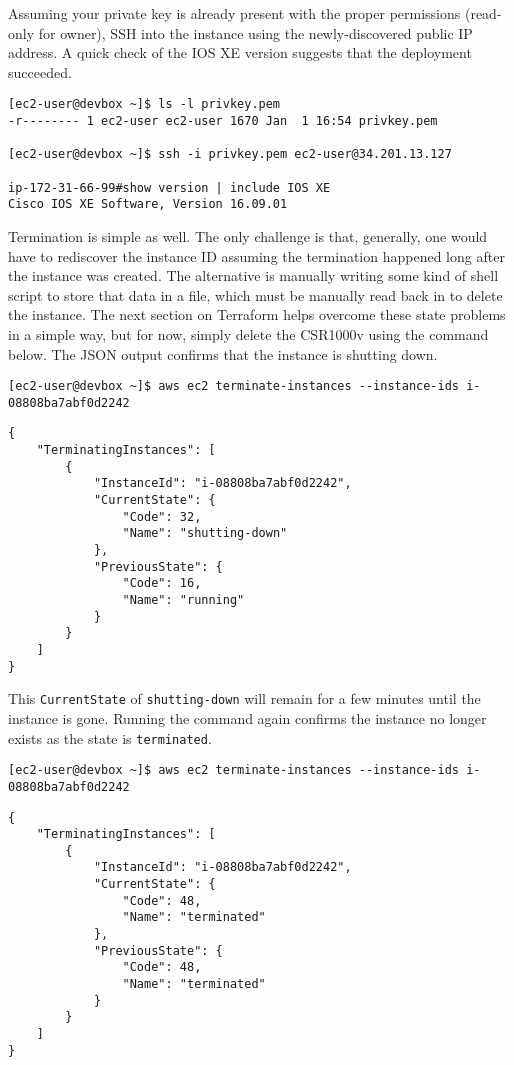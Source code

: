 Assuming your private key is already present with the proper permissions
(read-only for owner), SSH into the instance using the newly-discovered public
IP address. A quick check of the IOS XE version suggests that the deployment
succeeded.

\begin{verbatim}
[ec2-user@devbox ~]$ ls -l privkey.pem 
-r-------- 1 ec2-user ec2-user 1670 Jan  1 16:54 privkey.pem

[ec2-user@devbox ~]$ ssh -i privkey.pem ec2-user@34.201.13.127

ip-172-31-66-99#show version | include IOS XE
Cisco IOS XE Software, Version 16.09.01
\end{verbatim}

Termination is simple as well. The only challenge is that, generally, one
would have to rediscover the instance ID assuming the termination happened
long after the instance was created. The alternative is manually writing some
kind of shell script to store that data in a file, which must be manually read
back in to delete the instance. The next section on Terraform helps overcome
these state problems in a simple way, but for now, simply delete the CSR1000v
using the command below. The JSON output confirms that the instance is
shutting down.

\begin{verbatim}
[ec2-user@devbox ~]$ aws ec2 terminate-instances --instance-ids i-08808ba7abf0d2242
\end{verbatim}

\begin{verbatim}
{
    "TerminatingInstances": [
        {
            "InstanceId": "i-08808ba7abf0d2242", 
            "CurrentState": {
                "Code": 32, 
                "Name": "shutting-down"
            }, 
            "PreviousState": {
                "Code": 16, 
                "Name": "running"
            }
        }
    ]
}
\end{verbatim}

This \verb|CurrentState| of \verb|shutting-down| will remain for a few minutes
until the instance is gone. Running the command again confirms the instance no
longer exists as the state is \verb|terminated|.

\begin{verbatim}
[ec2-user@devbox ~]$ aws ec2 terminate-instances --instance-ids i-08808ba7abf0d2242
\end{verbatim}

\begin{verbatim}
{
    "TerminatingInstances": [
        {
            "InstanceId": "i-08808ba7abf0d2242", 
            "CurrentState": {
                "Code": 48, 
                "Name": "terminated"
            }, 
            "PreviousState": {
                "Code": 48, 
                "Name": "terminated"
            }
        }
    ]
}
\end{verbatim}


